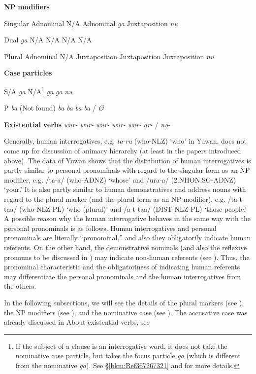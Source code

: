 \textbf{NP} \textbf{modifiers}          

Singular  Adnominal  N/A  Adnominal  \textit{ga}  Juxtaposition  \textit{nu}

Dual     \textit{ga}  N/A  N/A  N/A  N/A

Plural  Adnominal  N/A  Juxtaposition  Juxtaposition  Juxtaposition  \textit{nu}

\textbf{Case} \textbf{particles}          

S/A     \textit{ga}  N/A\footnote{If the subject of a clause is an interrogative word, it does not take the nominative case particle, but takes the focus particle \textit{ga} (which is different from the nominative \textit{ga}). See §\ref{bkm:Ref367267321} and  for more details.}  \textit{ga}  \textit{ga}  \textit{nu}

P     \textit{ba}  (Not found)  \textit{ba}  \textit{ba}  \textit{ba}  \textit{ba} / \textit{Ø}

\textbf{Existential} \textbf{verbs}      \textit{wur-}  \textit{wur-}  \textit{wur-}  \textit{wur-}  \textit{wur-}  \textit{ar-} / \textit{nə-}

Generally, human interrogatives, e.g. \textit{ta-ru} (who-NLZ) ‘who’ in Yuwan, does not come up for discussion of animacy hierarchy (at least in the papers introduced above). The data of Yuwan shows that the distribution of human interrogatives is partly similar to personal pronominals with regard to the singular form as an NP modifier, e.g. /ta-a/ (who-ADNZ) ‘whose’ and /ura-a/ (2.NHON.SG-ADNZ) ‘your.’ It is also partly similar to human demonstratives and address nouns with regard to the plural marker (and the plural form as an NP modifier), e.g. /ta-t-taa/ (who-NLZ-PL) ‘who (plural)’ and /a-t-taa/ (DIST-NLZ-PL) ‘those people.’ A possible reason why the human interrogative behaves in the same way with the personal pronominals is as follows. Human interrogatives and personal pronominals are literally “pronominal,” and also they obligatorily indicate human referents. On the other hand, the demonstrative nominals (and also the reflexive pronouns to be discussed in ) may indicate non-human referents (see ). Thus, the pronominal characteristic and the obligatoriness of indicating human referents may differentiate the personal pronominals and the human interrogatives from the others.

In the following subsections, we will see the details of the plural markers (see ), the NP modifiers (see ), and the nominative case (see ). The accusative case was already discussed in  About existential verbs, see 

